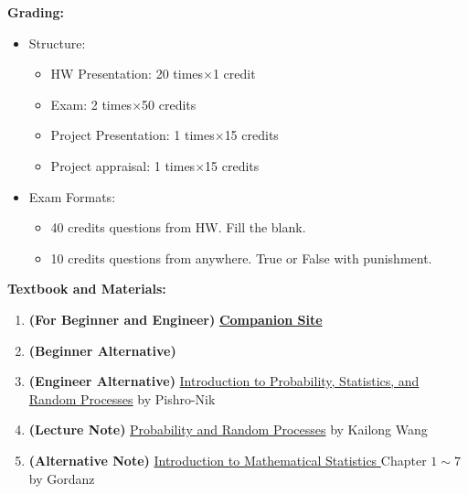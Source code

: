\documentclass{article}
\begin{document}
\textbf{Grading:} {
    \begin{itemize}
        \item Structure: {
            \begin{itemize}
                \item HW Presentation: 20 times$\times$1 credit
                \item Exam: 2 times$\times$50 credits
                \item Project Presentation: 1 times$\times$15 credits
                \item Project appraisal: 1 times$\times$15 credits
            \end{itemize}
        }
        \item Exam Formats: {
            \begin{itemize}
                \item 40 credits questions from HW. Fill the blank.
                \item 10 credits questions from anywhere. True or False with punishment.
            \end{itemize}
        }
    \end{itemize}
}

\textbf{Textbook and Materials:} {
    \begin{enumerate}
        \item \textbf{(For Beginner and Engineer)} \label{book:Yates_Goodman_2015}
        \href{https://bcs.wiley.com/he-bcs/Books?action=index&itemId=1118324560&bcsId=8677}{\textbf{Companion Site}}
        \item \textbf{(Beginner Alternative)} 
        \item \textbf{(Engineer Alternative)} \href{https://www.probabilitycourse.com/}{Introduction to Probability, Statistics, and Random Processes} by Pishro-Nik
        \item \textbf{(Lecture Note)} \href{https://github.com/kwang0913/MyLatex/blob/main/2023ECE226Note/main.pdf}{Probability and Random Processes} by Kailong Wang
        \item \textbf{(Alternative Note)} \href{https://web.ma.utexas.edu/users/gordanz/lecture_notes_page.html}{Introduction to Mathematical Statistics
        } Chapter $1\sim7$ by Gordanz
    \end{enumerate}
}
\end{document}
